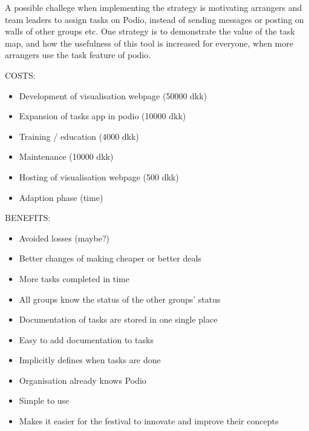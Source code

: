 A possible challege when implementing the strategy is motivating arrangers and team leaders to assign tasks on Podio, instead of sending messages or posting on walls of other groups etc. One strategy is to demonstrate the value of the task map, and how the usefulness of this tool is increased for everyone, when more arrangers use the task feature of podio.




COSTS:
\begin{itemize}
    \item Development of visualisation webpage (50000 dkk)
    \item Expansion of tasks app in podio (10000 dkk)
    \item Training / education (4000 dkk)
    \item Maintenance (10000 dkk)
    \item Hosting of visualisation webpage (500 dkk)
    \item Adaption phase (time)
\end{itemize}

BENEFITS:
\begin{itemize}
    \item Avoided losses (maybe?)
    \item Better changes of making cheaper or better deals
    \item More tasks completed in time
    \item All groups know the status of the other groups' status
    \item Documentation of tasks are stored in one single place
    \item Easy to add documentation to tasks
    \item Implicitly defines when tasks are done
    \item Organisation already knows Podio
    \item Simple to use
    \item Makes it easier for the festival to innovate and improve their concepts
\end{itemize}

